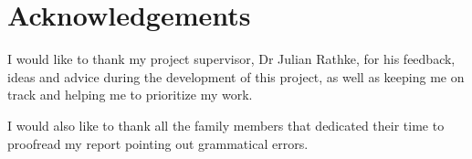 \section{Acknowledgements}

I would like to thank my project supervisor, Dr Julian Rathke, for his feedback, ideas and advice during the development of this project, as well as keeping me on track and helping me to prioritize my work.

I would also like to thank all the family members that dedicated their time to proofread my report pointing out grammatical errors.